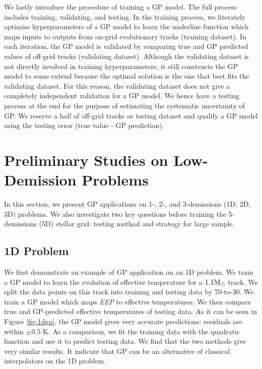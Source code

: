 We lastly introduce the procedure of training a GP model. The full process includes training, validating, and testing. 
In the training process, we literately optimise hyperparameters of a GP model to learn the underline function which maps inputs to outputs from on-grid evolutionary tracks (training dataset). In each iteration, the GP model is validated by comparing true and GP predicted values of off-grid tracks (validating dataset). Although the validating dataset is not directly involved in training hyperparameters, it still constructs the GP model to some extend because the optimal solution is the one that best fits the validating dataset. For this reason, the validating dataset does not give a completely independent validation for a GP model. 
%
We hence have a testing process at the end for the purpose of estimating the systematic uncertainty of GP. We reserve a half of off-grid tracks as testing dataset and qualify a GP model using the testing error (true value - GP prediction).


\section{Preliminary Studies on Low-Demission Problems}\label{examples}

In this section, we present GP applications on 1-, 2-, and 3-demissions (1D, 2D, 3D) problems. We also investigate two key questions before training the 5-demissions (5D) stellar grid: testing method and strategy for large sample. 

\subsection{1D Problem}

We first demonstrate an example of GP application on an 1D problem. We train a GP model to learn the evolution of effective temperature for a $\rm 1.1M_{\odot}$ track. We split the data points on this track into training and testing data by 70-to-30. We train a GP model which maps  {\it EEP} to effective temperatures. We then compare true and GP-predicted effective temperatures of testing data. As it can be seen in Figure \ref{fig:1dgp},  the GP model gives very accurate predictions: residuals are within $\pm$0.5 K. As a comparison, we fit the training data with the quadratic function and use it to predict testing data. We find that the two methods give very similar results. It indicate that GP can be an alternative of classical interpolators on the 1D problem. 

